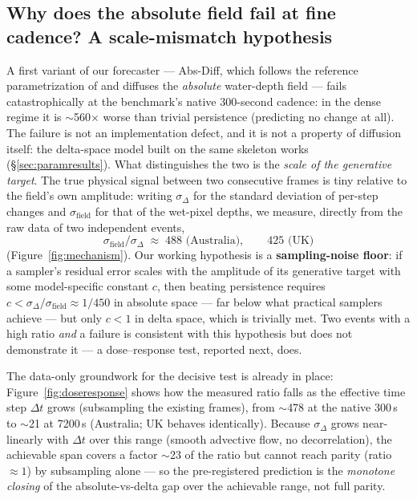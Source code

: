 \documentclass[11pt]{article}
\newcommand{\absdiff}{\mbox{Abs-Diff}}          %
\begin{document}
\subsection{Why does the absolute field fail at fine cadence? A scale-mismatch hypothesis}
\label{sec:mechanism}
A first variant of our forecaster --- \absdiff{}, which follows the
reference parametrization of \citet{diffsparse2025} and diffuses the
\emph{absolute} water-depth field --- fails catastrophically at the
benchmark's native 300-second cadence: in the dense regime it is
$\sim$560$\times$ worse than trivial persistence (predicting no change at
all). The failure is not an implementation defect, and it is not a
property of diffusion itself: the delta-space model built on the same
skeleton works (\S\ref{sec:paramresults}). What distinguishes the two is
the \emph{scale of the generative target}. The true physical signal
between two consecutive frames is tiny relative to the field's own
amplitude: writing $\sigma_\Delta$ for the standard deviation of per-step
changes and $\sigma_{\text{field}}$ for that of the wet-pixel depths, we
measure, directly from the raw data of two independent events,
\begin{equation}
\sigma_{\text{field}} / \sigma_\Delta \;\approx\; 488 \text{ (Australia)}, \qquad 425 \text{ (UK)}
\end{equation}
(Figure~\ref{fig:mechanism}). Our working hypothesis is a
\textbf{sampling-noise floor}: if a sampler's residual error scales with
the amplitude of its generative target with some model-specific constant
$c$, then beating persistence requires $c < \sigma_\Delta /
\sigma_{\text{field}} \approx 1/450$ in absolute space --- far below what
practical samplers achieve --- but only $c < 1$ in delta space, which is
trivially met. Two events with a high ratio \emph{and} a failure is
consistent with this hypothesis but does not demonstrate it --- a
dose--response test, reported next, does.

The data-only groundwork for the decisive test is already in place:
Figure~\ref{fig:doseresponse} shows how the measured ratio falls as the
effective time step $\Delta t$ grows (subsampling the existing frames),
from $\sim$478 at the native 300\,s to $\sim$21 at 7200\,s (Australia;
UK behaves identically). Because $\sigma_\Delta$ grows near-linearly with
$\Delta t$ over this range (smooth advective flow, no decorrelation), the
achievable span covers a factor $\sim$23 of the ratio but cannot reach
parity (ratio $\approx 1$) by subsampling alone --- so the pre-registered
prediction is the \emph{monotone closing} of the absolute-vs-delta gap
over the achievable range, not full parity.
\end{document}
